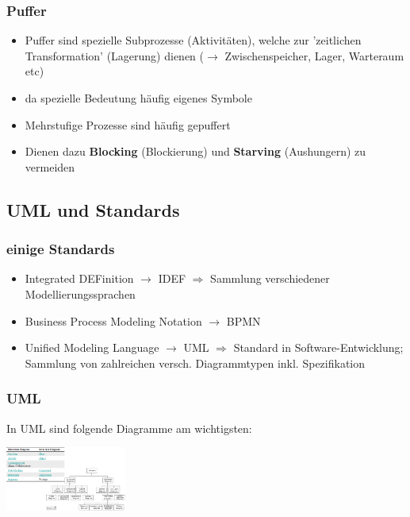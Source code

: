 \documentclass{report}
\newenvironment{Figure}
	{\par\medskip\noindent\minipage{\linewidth}}
	{\endminipage\par\medskip}
\theoremstyle{definition}
\theoremstyle{example}
\begin{document}
      \subsubsection{Puffer}
\begin{itemize}
   \item Puffer sind spezielle Subprozesse (Aktivitäten), welche zur 'zeitlichen Transformation' (Lagerung) dienen ($\rightarrow$ Zwischenspeicher, Lager, Warteraum etc)
   \item da spezielle Bedeutung häufig eigenes Symbole
   \item Mehrstufige Prozesse sind häufig gepuffert
   \item Dienen dazu \textbf{Blocking} (Blockierung) und \textbf{Starving} (Aushungern) zu vermeiden
\end{itemize}

   \subsection{UML und Standards}

      \subsubsection{einige Standards}
\begin{itemize}
   \item Integrated DEFinition $\rightarrow$ IDEF $\Rightarrow$ Sammlung verschiedener Modellierungssprachen
   \item Business Process Modeling Notation $\rightarrow$ BPMN 
   \item Unified Modeling Language $\rightarrow$ UML $\Rightarrow$ Standard in Software-Entwicklung; Sammlung von zahlreichen versch. Diagrammtypen inkl. Spezifikation
\end{itemize}

      \subsubsection{UML}
In UML sind folgende Diagramme am wichtigsten:

\begin{Figure}
\centering
\includegraphics[width=150px]{img/TopOfUML.png}
	\label{fig:Übersicht der wichtigsten UML Diagramme}
\end{Figure}
\end{document}
